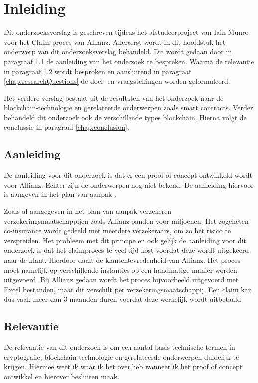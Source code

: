 \chapter{Inleiding}
Dit onderzoeksverslag is geschreven tijdens het afstudeerproject van Iain Munro voor het Claim proces van Allianz. Allereerst wordt in dit hoofdstuk het onderwerp van dit onderzoeksverslag behandeld. Dit wordt gedaan door in paragraaf \ref{chap:motivation} de aanleiding van het onderzoek te bespreken. Waarna de relevantie in paragraaf \ref{chap:relevance} wordt besproken en aansluitend in paragraaf \ref{chap:researchQuestions} de doel- en vraagstellingen worden geformuleerd.\par

Het verdere verslag bestaat uit de resultaten van het onderzoek naar de blockchain-technologie en gerelateerde onderwerpen zoals smart contracts. Verder behandeld dit onderzoek ook de verschillende types blockchain. Hierna volgt de conclussie in paragraaf \ref{chap:conclusion}.

\section{Aanleiding}\label{chap:motivation}
De aanleiding voor dit onderzoek is dat er een proof of concept ontwikkeld wordt voor Allianz. Echter zijn de onderwerpen nog niet bekend. De aanleiding hiervoor is aangeven in het plan van aanpak \cite{pva}.

Zoals al aangegeven in het plan van aanpak \cite{pva} verzekeren verzekeringsmaatschappijen zoals Allianz panden voor miljoenen. Het zogeheten co-insurance wordt gedeeld met meerdere verzekeraars, om zo het risico te verspreiden. Het probleem met dit principe en ook gelijk de aanleiding voor dit onderzoek is dat het claimproces te veel tijd kost voordat deze wordt uitgekeerd naar de klant. Hierdoor daalt de klantentevredenheid van Allianz. Het proces moet namelijk op verschillende instanties op een handmatige manier worden uitgevoerd. Bij Allianz gedaan wordt het proces bijvoorbeeld uitgevoerd met Excel bestanden, maar dit verschilt per verzekeringsmaatschappij. Een claim kan dus vaak meer dan 3 maanden duren voordat deze werkelijk wordt uitbetaald.

\section{Relevantie}\label{chap:relevance}
De relevantie van dit onderzoek is om een aantal basis technische termen in cryptografie, blockchain-technologie en gerelateerde onderwerpen duidelijk te krijgen. Hiermee weet ik waar ik het over heb wanneer ik het proof of concept ontwikkel en hierover besluiten maak.\par

